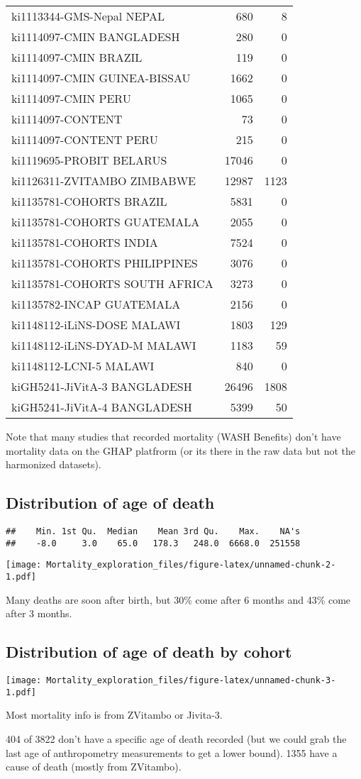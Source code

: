 \documentclass[]{article}
\begin{document}
\begin{longtable}[]{@{}lrr@{}}
ki1113344-GMS-Nepal NEPAL & 680 & 8\tabularnewline
ki1114097-CMIN BANGLADESH & 280 & 0\tabularnewline
ki1114097-CMIN BRAZIL & 119 & 0\tabularnewline
ki1114097-CMIN GUINEA-BISSAU & 1662 & 0\tabularnewline
ki1114097-CMIN PERU & 1065 & 0\tabularnewline
ki1114097-CONTENT & 73 & 0\tabularnewline
ki1114097-CONTENT PERU & 215 & 0\tabularnewline
ki1119695-PROBIT BELARUS & 17046 & 0\tabularnewline
ki1126311-ZVITAMBO ZIMBABWE & 12987 & 1123\tabularnewline
ki1135781-COHORTS BRAZIL & 5831 & 0\tabularnewline
ki1135781-COHORTS GUATEMALA & 2055 & 0\tabularnewline
ki1135781-COHORTS INDIA & 7524 & 0\tabularnewline
ki1135781-COHORTS PHILIPPINES & 3076 & 0\tabularnewline
ki1135781-COHORTS SOUTH AFRICA & 3273 & 0\tabularnewline
ki1135782-INCAP GUATEMALA & 2156 & 0\tabularnewline
ki1148112-iLiNS-DOSE MALAWI & 1803 & 129\tabularnewline
ki1148112-iLiNS-DYAD-M MALAWI & 1183 & 59\tabularnewline
ki1148112-LCNI-5 MALAWI & 840 & 0\tabularnewline
kiGH5241-JiVitA-3 BANGLADESH & 26496 & 1808\tabularnewline
kiGH5241-JiVitA-4 BANGLADESH & 5399 & 50\tabularnewline
\bottomrule
\end{longtable}

Note that many studies that recorded mortality (WASH Benefits) don't
have mortality data on the GHAP platfrorm (or its there in the raw data
but not the harmonized datasets).

\subsection{Distribution of age of
death}\label{distribution-of-age-of-death}

\begin{verbatim}
##    Min. 1st Qu.  Median    Mean 3rd Qu.    Max.    NA's 
##    -8.0     3.0    65.0   178.3   248.0  6668.0  251558
\end{verbatim}

\texttt{[image: Mortality\_exploration\_files/figure-latex/unnamed-chunk-2-1.pdf]}

Many deaths are soon after birth, but 30\% come after 6 months and 43\%
come after 3 months.

\subsection{Distribution of age of death by
cohort}\label{distribution-of-age-of-death-by-cohort}

\texttt{[image: Mortality\_exploration\_files/figure-latex/unnamed-chunk-3-1.pdf]}

Most mortality info is from ZVitambo or Jivita-3.

404 of 3822 don't have a specific age of death recorded (but we could
grab the last age of anthropometry measurements to get a lower bound).
1355 have a cause of death (mostly from ZVitambo).
\end{document}
